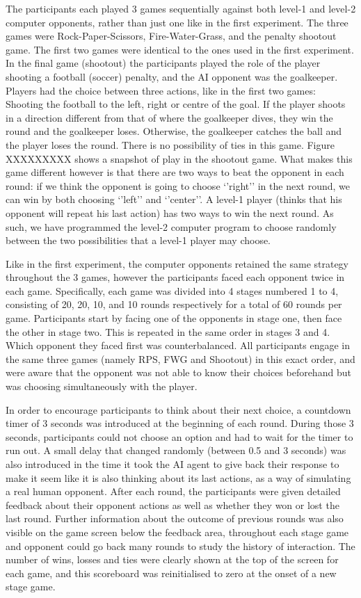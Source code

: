 \documentclass[man,floatsintext]{apa6}
\begin{document}
The participants each played 3 games sequentially against both level-1 and level-2 computer opponents, rather than just one like in the first experiment. The three games were Rock-Paper-Scissors, Fire-Water-Grass, and the penalty shootout game. The first two games were identical to the ones used in the first experiment. In the final game (shootout) the participants played the role of the player shooting a football (soccer) penalty, and the AI opponent was the goalkeeper. Players had the choice between three actions, like in the first two games: Shooting the football to the left, right or centre of the goal. If the player shoots in a direction different from that of where the goalkeeper dives, they win the round and the goalkeeper loses. Otherwise, the goalkeeper catches the ball and the player loses the round. There is no possibility of ties in this game. Figure XXXXXXXXX shows a snapshot of play in the shootout game. What makes this game different however is that there are two ways to beat the opponent in each round: if we think the opponent is going to choose `'right'' in the next round, we can win by both choosing `'left'' and `'center''. A level-1 player (thinks that his opponent will repeat his last action) has two ways to win the next round. As such, we have programmed the level-2 computer program to choose randomly between the two possibilities that a level-1 player may choose.

Like in the first experiment, the computer opponents retained the same strategy throughout the 3 games, however the participants faced each opponent twice in each game. Specifically, each game was divided into 4 stages numbered 1 to 4, consisting of 20, 20, 10, and 10 rounds respectively for a total of 60 rounds per game. Participants start by facing one of the opponents in stage one, then face the other in stage two. This is repeated in the same order in stages 3 and 4. Which opponent they faced first was counterbalanced. All participants engage in the same three games (namely RPS, FWG and Shootout) in this exact order, and were aware that the opponent was not able to know their choices beforehand but was choosing simultaneously with the player.

In order to encourage participants to think about their next choice, a countdown timer of 3 seconds was introduced at the beginning of each round. During those 3 seconds, participants could not choose an option and had to wait for the timer to run out. A small delay that changed randomly (between 0.5 and 3 seconds) was also introduced in the time it took the AI agent to give back their response to make it seem like it is also thinking about its last actions, as a way of simulating a real human opponent. After each round, the participants were given detailed feedback about their opponent actions as well as whether they won or lost the last round. Further information about the outcome of previous rounds was also visible on the game screen below the feedback area, throughout each stage game and opponent could go back many rounds to study the history of interaction. The number of wins, losses and ties were clearly shown at the top of the screen for each game, and this scoreboard was reinitialised to zero at the onset of a new stage game.
\end{document}

